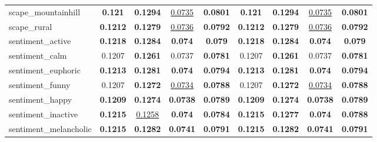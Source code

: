 \begin{center}
\begin{supertabular}{lcccc||cccc}
\small{scape\_mountainhill} & \textbf{\scriptsize{0.121}} & \textbf{\scriptsize{0.1294}} & \underline{\scriptsize{0.0735}} & \textbf{\scriptsize{0.0801}}& \textbf{\scriptsize{0.121}} & \textbf{\scriptsize{0.1294}} & \underline{\scriptsize{0.0735}} & \textbf{\scriptsize{0.0801}}\\
\small{scape\_rural} & \textbf{\scriptsize{0.1212}} & \textbf{\scriptsize{0.1279}} & \underline{\scriptsize{0.0736}} & \textbf{\scriptsize{0.0792}}& \textbf{\scriptsize{0.1212}} & \textbf{\scriptsize{0.1279}} & \underline{\scriptsize{0.0736}} & \textbf{\scriptsize{0.0792}}\\
\small{sentiment\_active} & \textbf{\scriptsize{0.1218}} & \textbf{\scriptsize{0.1284}} & \textbf{\scriptsize{0.074}} & \textbf{\scriptsize{0.079}}& \textbf{\scriptsize{0.1218}} & \textbf{\scriptsize{0.1284}} & \textbf{\scriptsize{0.074}} & \textbf{\scriptsize{0.079}}\\
\small{sentiment\_calm} & {\scriptsize{0.1207}} & \textbf{\scriptsize{0.1261}} & {\scriptsize{0.0737}} & \textbf{\scriptsize{0.0781}}& {\scriptsize{0.1207}} & \textbf{\scriptsize{0.1261}} & {\scriptsize{0.0737}} & \textbf{\scriptsize{0.0781}}\\
\small{sentiment\_euphoric} & \textbf{\scriptsize{0.1213}} & \textbf{\scriptsize{0.1281}} & \textbf{\scriptsize{0.074}} & \textbf{\scriptsize{0.0794}}& \textbf{\scriptsize{0.1213}} & \textbf{\scriptsize{0.1281}} & \textbf{\scriptsize{0.074}} & \textbf{\scriptsize{0.0794}}\\
\small{sentiment\_funny} & {\scriptsize{0.1207}} & \textbf{\scriptsize{0.1272}} & \underline{\scriptsize{0.0734}} & \textbf{\scriptsize{0.0788}}& {\scriptsize{0.1207}} & \textbf{\scriptsize{0.1272}} & \underline{\scriptsize{0.0734}} & \textbf{\scriptsize{0.0788}}\\
\small{sentiment\_happy} & \textbf{\scriptsize{0.1209}} & \textbf{\scriptsize{0.1274}} & \textbf{\scriptsize{0.0738}} & \textbf{\scriptsize{0.0789}}& \textbf{\scriptsize{0.1209}} & \textbf{\scriptsize{0.1274}} & \textbf{\scriptsize{0.0738}} & \textbf{\scriptsize{0.0789}}\\
\small{sentiment\_inactive} & \textbf{\scriptsize{0.1215}} & \underline{\scriptsize{0.1258}} & \textbf{\scriptsize{0.074}} & \textbf{\scriptsize{0.0784}}& \textbf{\scriptsize{0.1215}} & \textbf{\scriptsize{0.1277}} & \textbf{\scriptsize{0.074}} & \textbf{\scriptsize{0.0788}}\\
\small{sentiment\_melancholic} & \textbf{\scriptsize{0.1215}} & \textbf{\scriptsize{0.1282}} & \textbf{\scriptsize{0.0741}} & \textbf{\scriptsize{0.0791}}& \textbf{\scriptsize{0.1215}} & \textbf{\scriptsize{0.1282}} & \textbf{\scriptsize{0.0741}} & \textbf{\scriptsize{0.0791}}\\

\end{supertabular}
\end{center}
